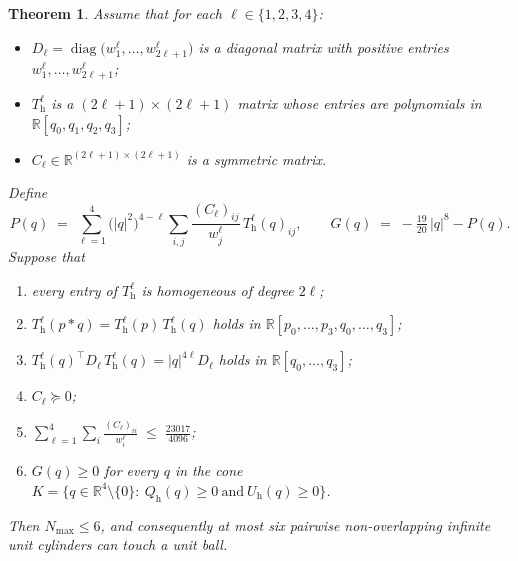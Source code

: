 \documentclass[reqno]{amsart}
\newtheorem{theorem}{Theorem}[section]
\theoremstyle{definition}
\DeclareMathOperator{\diag}{diag}
\newcommand{\R}{\mathbb{R}}
\begin{document}
\begin{theorem}\label{thm:polyform}
Assume that for each $\ell\in\{1,2,3,4\}$:
\begin{itemize}[leftmargin=1.4em]
\item
      $D_\ell=\diag\bigl(w^\ell_1,\dots,w^\ell_{2\ell+1}\bigr)$ is a diagonal matrix with positive entries $w^\ell_1,\dots,w^\ell_{2\ell+1}$;
\item $T^\ell_{\mathrm h}$ is a $(2\ell+1)\times(2\ell+1)$ matrix whose entries are polynomials
      in $\R[q_0,q_1,q_2,q_3]$;
\item $C_\ell\in\R^{(2\ell+1)\times(2\ell+1)}$ is a symmetric matrix.
\end{itemize}
Define
\[
P(q)\;=\;\sum_{\ell=1}^{4}\bigl(|q|^{2}\bigr)^{4-\ell}
\sum_{i,j}\frac{(C_\ell)_{ij}}{w^\ell_j}\,T^\ell_{\mathrm h}(q)_{ij},
\qquad
G(q)\;=\;-\tfrac{19}{20}\,|q|^{8}-P(q).
\]
Suppose that
\begin{enumerate}[leftmargin=2.6em,label=(H\arabic*)]
\item\label{H:hom} every entry of $T^\ell_{\mathrm h}$ is homogeneous of degree $2\ell$;
\item\label{H:mult} $T^\ell_{\mathrm h}(p*q)=T^\ell_{\mathrm h}(p)\,T^\ell_{\mathrm h}(q)$
      holds in $\R[p_0,\dots,p_3,q_0,\dots,q_3]$;
\item\label{H:orth} $T^\ell_{\mathrm h}(q)^{\top}D_\ell\,T^\ell_{\mathrm h}(q)
      =|q|^{4\ell}D_\ell$ holds in $\R[q_0,\dots,q_3]$;
\item\label{H:psd} $C_\ell\succeq0$;
\item\label{H:trace} $\displaystyle\sum_{\ell=1}^{4}\sum_{i}\frac{(C_\ell)_{ii}}{w^\ell_i}
      \;\le\;\frac{23017}{4096}$;
\item\label{H:cover} $G(q)\ge0$ for every $q$ in the cone
      $K=\{q\in\R^4\setminus\{0\}:\ Q_{\mathrm h}(q)\ge0\ \text{and}\ U_{\mathrm h}(q)\ge0\}$.
\end{enumerate}
Then $N_{\max}\le6$, and consequently at most six pairwise non-overlapping infinite unit cylinders can
touch a unit ball.
\end{theorem}
\end{document}
